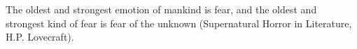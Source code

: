 \documentclass[fontsize=12pt, paper=a4]{scrartcl}
\begin{document}
The oldest and strongest emotion of mankind is fear, and the oldest and 
strongest kind of fear is fear of the unknown (Supernatural Horror in 
Literature, H.P. Lovecraft).
\end{document}
